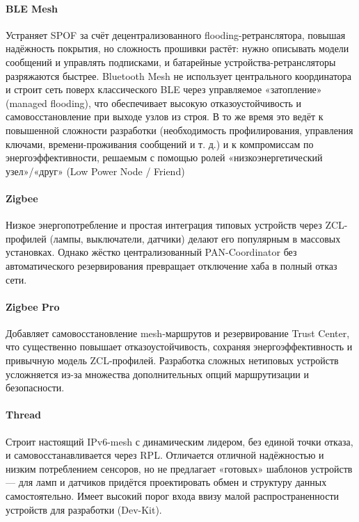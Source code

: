 \documentclass[a4paper,12pt]{article}
\begin{document}
\paragraph{BLE Mesh}
Устраняет SPOF за счёт децентрализованного flooding-ретранслятора, повышая надёжность покрытия, но сложность прошивки растёт: нужно описывать модели сообщений и управлять подписками, и батарейные устройства-ретрансляторы разряжаются быстрее.
Bluetooth Mesh не использует центрального координатора и строит сеть поверх классического BLE через управляемое «затопление» (managed flooding), что обеспечивает высокую отказоустойчивость и самовосстановление при выходе узлов из строя. В то же время это ведёт к повышенной сложности разработки (необходимость профилирования, управления ключами, времени-проживания сообщений и т. д.) и к компромиссам по энергоэффективности, решаемым с помощью ролей «низкоэнергетический узел»/«друг» (Low Power Node / Friend)

\paragraph{Zigbee}
Низкое энергопотребление и простая интеграция типовых устройств через ZCL-профилей (лампы, выключатели, датчики) делают его популярным в массовых установках. Однако жёстко централизованный PAN-Coordinator без автоматического резервирования превращает отключение хаба в полный отказ сети.

\paragraph{Zigbee Pro}
Добавляет самовосстановление mesh-маршрутов и резервирование Trust Center, что существенно повышает отказоустойчивость, сохраняя энергоэффективность и привычную модель ZCL-профилей. Разработка сложных нетиповых устройств усложняется из-за множества дополнительных опций маршрутизации и безопасности.

\paragraph{Thread}
Строит настоящий IPv6-mesh с динамическим лидером, без единой точки отказа, и самовосстанавливается через RPL. Отличается отличной надёжностью и низким потреблением сенсоров, но не предлагает «готовых» шаблонов устройств — для ламп и датчиков придётся проектировать обмен и структуру данных самостоятельно. Имеет высокий порог входа ввизу малой распространенности устройств для разработки (Dev-Kit).
\end{document}
